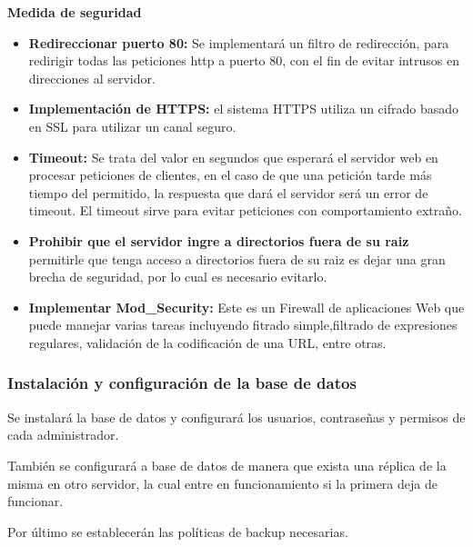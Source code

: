 \documentclass[a4paper,12pt]{article}
\begin{document}
\textbf{Medida de seguridad}
\begin{itemize}
	\item \textbf{Redireccionar puerto 80: } Se implementará un filtro de redirección, para redirigir todas las peticiones http a puerto 80, con el fin de evitar intrusos en direcciones al servidor.
	\item \textbf{Implementación de HTTPS: } el sistema HTTPS utiliza un cifrado basado en SSL para utilizar un canal seguro.
	\item \textbf{Timeout: }Se trata del valor en segundos que esperará el servidor web en procesar peticiones de clientes, en el caso de que una petición tarde más tiempo del permitido, la respuesta que dará el servidor será un error de timeout. El timeout sirve para evitar peticiones con comportamiento extraño.
	\item \textbf{Prohibir que el servidor ingre a directorios fuera de su raiz} permitirle que tenga acceso a directorios fuera de su raiz es dejar una gran brecha de seguridad, por lo cual es necesario evitarlo.
	\item \textbf{Implementar Mod\_Security:} Este es un Firewall de aplicaciones Web que puede manejar varias tareas incluyendo fitrado simple,filtrado de expresiones regulares, validación de la codificación de una URL, entre otras.
\end{itemize}

\subsubsection{Instalación y configuración de la base de datos}
	Se instalará la base de datos y configurará los usuarios, contraseñas y permisos de cada administrador.
	
	También se configurará a base de datos de manera que exista una réplica de la  misma en otro servidor, la cual entre en funcionamiento si la primera deja de funcionar.
	
	Por último se establecerán las políticas de backup necesarias.
\end{document}
